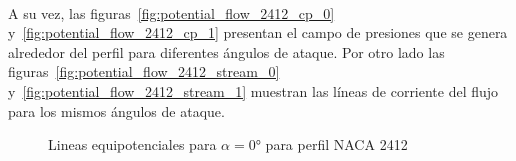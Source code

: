 \documentclass[letterpaper, openright, 12pt]{book}
\begin{document}
    \paragraph*{}
    A su vez, las figuras~\ref{fig:potential_flow_2412_cp_0}
    y~\ref{fig:potential_flow_2412_cp_1} presentan el campo de presiones que se
    genera alrededor del perfil para diferentes ángulos de ataque. Por otro lado
    las figuras~\ref{fig:potential_flow_2412_stream_0}
    y~\ref{fig:potential_flow_2412_stream_1} muestran las líneas de corriente
    del flujo para los mismos ángulos de ataque.

    \begin{figure}[H]
        \centering
        \caption{Lineas equipotenciales para $\alpha = 0\si{\degree}$ para
          perfil NACA 2412}
        \label{fig:potential_flow_2412_potential}
    \end{figure}
\end{document}
